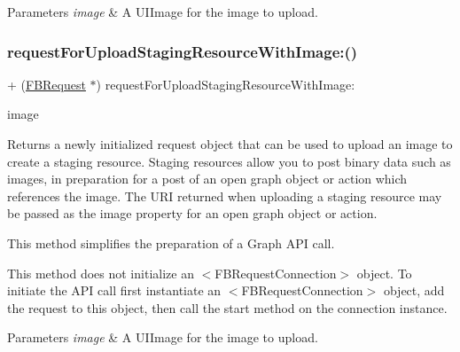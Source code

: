 \begin{DoxyParams}{Parameters}
{\em image} & A {\ttfamily U\+I\+Image} for the image to upload. \\
\hline
\end{DoxyParams}
\mbox{\label{interfaceFBRequest_a4a85038bef70a9edd91a56ab0db0bfd6}} 
\subsubsection{\texorpdfstring{request\+For\+Upload\+Staging\+Resource\+With\+Image\+:()}{requestForUploadStagingResourceWithImage:()}\hspace{0.1cm}{\footnotesize\ttfamily [3/5]}}
{\footnotesize\ttfamily + (\hyperlink{interfaceFBRequest}{F\+B\+Request} $\ast$) request\+For\+Upload\+Staging\+Resource\+With\+Image\+: \begin{DoxyParamCaption}\item[{(U\+I\+Image $\ast$)}]{image }\end{DoxyParamCaption}}

Returns a newly initialized request object that can be used to upload an image to create a staging resource. Staging resources allow you to post binary data such as images, in preparation for a post of an open graph object or action which references the image. The U\+RI returned when uploading a staging resource may be passed as the image property for an open graph object or action.

This method simplifies the preparation of a Graph A\+PI call.

This method does not initialize an $<$\+F\+B\+Request\+Connection$>$ object. To initiate the A\+PI call first instantiate an $<$\+F\+B\+Request\+Connection$>$ object, add the request to this object, then call the {\ttfamily start} method on the connection instance.


\begin{DoxyParams}{Parameters}
{\em image} & A {\ttfamily U\+I\+Image} for the image to upload. \\
\hline
\end{DoxyParams}
\mbox{\label{interfaceFBRequest_a4a85038bef70a9edd91a56ab0db0bfd6}} 
